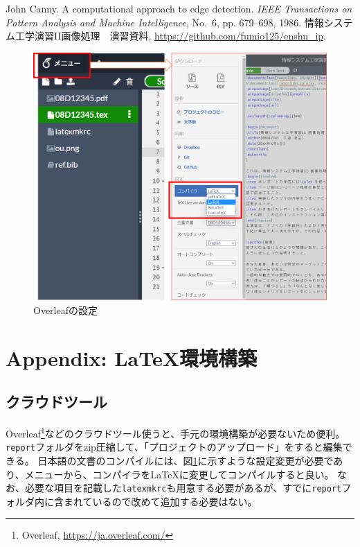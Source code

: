\documentclass[twocolumn, a4paper]{jsarticle}
\begin{document}
\begin{thebibliography}{99}
 John Canny. A computational approach to edge detection. {\em IEEE Transactions on Pattern Analysis and Machine Intelligence},  No.~6, pp. 679--698, 1986.
 情報システム工学演習II画像処理　演習資料, \url{https://github.com/fumio125/enshu_ip}.
\end{thebibliography}


\begin{figure}[t]
\centering
\includegraphics[width=\linewidth]{overleaf.png}
\caption{Overleafの設定}
\label{fig:overleaf}
\end{figure}

\section*{Appendix: \LaTeX 環境構築}
\subsection*{クラウドツール}
Overleaf\footnote{Overleaf, \url{https://ja.overleaf.com/}}などのクラウドツール使うと、手元の環境構築が必要ないため便利。\texttt{report}フォルダをzip圧縮して、「プロジェクトのアップロード」をすると編集できる。
日本語の文書のコンパイルには、図\ref{fig:overleaf}に示すような設定変更が必要であり、メニューから、コンパイラをLaTeXに変更してコンパイルすると良い。
なお、必要な項目を記載した\texttt{latexmkrc}も用意する必要があるが、すでに\texttt{report}フォルダ内に含まれているので改めて追加する必要はない。
\end{document}
